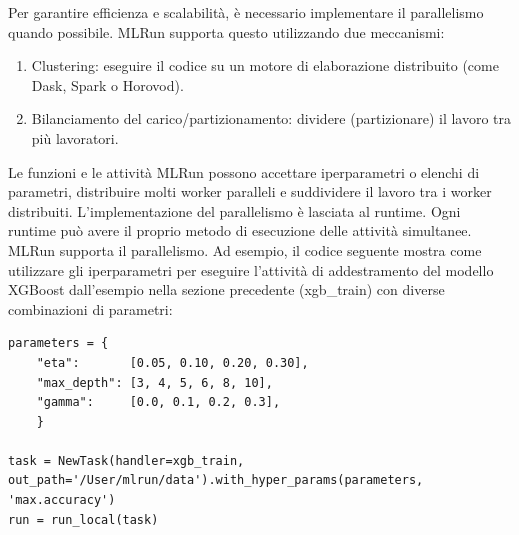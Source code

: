\documentclass[12pt,a4paper]{report}
\begin{document}
Per garantire efficienza e scalabilità, è necessario implementare il parallelismo quando possibile. MLRun supporta questo utilizzando due meccanismi:

\begin{enumerate}
    \item Clustering: eseguire il codice su un motore di elaborazione distribuito (come Dask, Spark o Horovod).
    \item Bilanciamento del carico/partizionamento: dividere (partizionare) il lavoro tra più lavoratori.
\end{enumerate}

Le funzioni e le attività MLRun possono accettare iperparametri o elenchi di parametri, distribuire molti worker paralleli e suddividere il lavoro tra i worker distribuiti. L'implementazione del parallelismo è lasciata al runtime. Ogni runtime può avere il proprio metodo di esecuzione delle attività simultanee.\\
MLRun supporta il parallelismo. Ad esempio, il codice seguente mostra come utilizzare gli iperparametri per eseguire l'attività di addestramento del modello XGBoost dall'esempio nella sezione precedente (xgb\_train) con diverse combinazioni di parametri:

\begin{lstlisting}
parameters = {
    "eta":       [0.05, 0.10, 0.20, 0.30],
    "max_depth": [3, 4, 5, 6, 8, 10],
    "gamma":     [0.0, 0.1, 0.2, 0.3],
    }

task = NewTask(handler=xgb_train, out_path='/User/mlrun/data').with_hyper_params(parameters, 'max.accuracy')
run = run_local(task)
\end{lstlisting}
\end{document}
